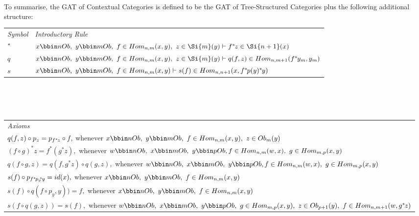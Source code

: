 \documentclass[10pt,a4paper]{scrartcl}
\newcommand{\ssub}{\kern-2pt^*\kern-1pt}
\renewcommand{\sub}{^*\kern-1pt}
\begin{document}
\noindent To summarise, the GAT of Contextual Categories is defined to be the GAT of Tree-Structured Categories plus
the following additional structure: \\
\vspace{0.1cm} 
\begin{tabular}{>{\itshape}l l}
Symbol & \itshape{Introductory Rule} \\[0.1cm]
$\sub $&$ \ofObi{x}{n} ,\  \ofObi{y}{m} ,\  \ofHomij{f}{n}{m}{x}{y} ,\  \ofT{z}{\Si{m}(y)}
\tstyle \ofT {f \sub z}{\Si{n+1}(x) } $\\[0.25cm]
$ q  $&$ \ofObi{x}{n} ,\  \ofObi{y}{m} ,\  \ofHomij{f}{n}{m}{x}{y} ,\  \ofT{z}{\Si{m}(y)}
\tstyle
                     \ofT{q(f,z)}{  \Homij{n}{m+1}(f\sub y_m  , y_m ) }$  \\ [0.25cm]
$ s  $ & $ \ofObi{x}{n} ,\  \ofObi{y}{m} ,\  \ofHomij{f}{n}{m}{x}{y} \tstyle
                 \ofT{s(f)} {\Homij{n}{n+1}(x,f \sub p (y)  \sub y)} $ \\ [0.25cm]


\end{tabular} \\
\vspace{.1cm}  \\
\vspace{.03cm} \\
\begin{tabular}{l}
\itshape{Axioms} \\
$q(f,z) \circ p_z =p_{f\sub z} \circ f,$ 
          whenever $\ofObi{x}{n} ,\  \ofObi{y}{m} ,\  \ofHomij{f}{n}{m}{x}{y} ,\  \ofT{z}{\Obi{m}(y)} $\\  [0.25cm]
					

$(f \circ g)^*z =  f^* (g ^* z), $
          whenever  $ \ofObi{w}{n} ,\ \ofObi{x}{m} ,\ \ofObi{y}{p}, 
					\ofHomij{f}{n}{m}{w}{x} ,\  \ofHomij{g}{m}{p}{x}{y}    $ \\[0.25cm]

$q(f \circ g,z) = q(f,g^*z) \circ q(g,z), $
				   whenever  $ \ofObi{w}{n} ,\ \ofObi{x}{m} ,\ \ofObi{y}{p}, 
					\ofHomij{f}{n}{m}{w}{x} ,\  \ofHomij{g}{m}{p}{x}{y}    $ \\[0.25cm]
					
$s(f) \circ p_{f \sub {p_y} \ssub y} = id(x),$ 
          whenever $\ofObi{x}{n} ,\  \ofObi{y}{m} ,\  \ofHomij{f}{n}{m}{x}{y} $ \\ [0.25cm]
				
$s(f) \circ q( f \circ p_y    ,y))=f, $	
          whenever	$ \ofObi{x}{n} ,\  \ofObi{y}{m} ,\  \ofHomij{f}{n}{m}{x}{y} $ \\ [0.25cm]		
					
$s(f \circ q(g,z))=s(f),$ 
          whenever $\ofObi{w}{n} ,\  \ofObi{x}{m}  ,\   \ofObi{y}{p} ,\    \ofHomij{g}{m}{p}{x}{y} ,\ \ofT{z}{\Obi{p+1}(y)} ,\ \ofHomij{f}{n}{m+1}{w}{g \sub z} $ \\ [0.25cm]				
					
\end{tabular}  \\
\end{document}
